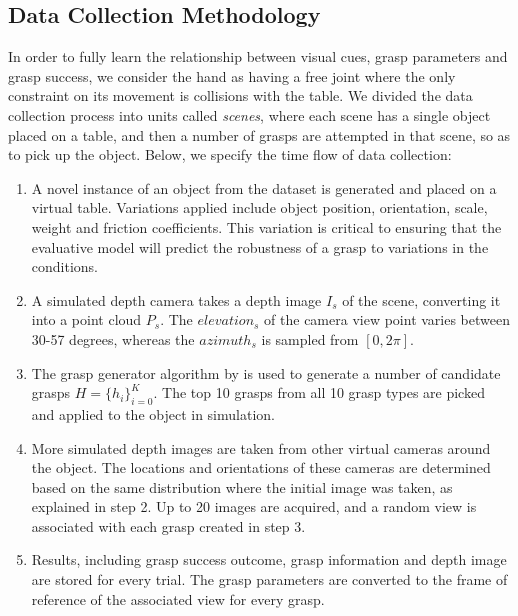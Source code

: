 \subsection{Data Collection Methodology}
\label{subsection:dataCollection}

In order to fully learn the relationship between visual cues, grasp parameters and grasp success, we  consider the hand as having a free joint where the only constraint on its movement is collisions with the table. We divided the data collection process into units called \textit{scenes}, where each scene has a single object placed on a table, and then a number of grasps are attempted in that scene, so as to pick up the object. Below, we specify the time flow of data collection:

\begin{enumerate}
\item A novel instance of an object from the dataset is generated and placed on a virtual table. Variations applied include object position, orientation, scale, weight and friction coefficients. This variation is critical to ensuring that the evaluative model will predict the robustness of a grasp to variations in the conditions.
\item A simulated depth camera takes a depth image $I_s$ of the scene, converting it into a point cloud $P_s$. The ${elevation}_s$ of the camera view point varies between 30-57 degrees, whereas the ${azimuth}_s$ is sampled from $[0, 2\pi]$. 
\item The grasp generator algorithm by \citet{kopicki2015ijrr} is used to generate a number of candidate grasps $H = \{h_i\}_{i=0}^{K}$. The top 10 grasps from all 10 grasp types are picked and applied to the object in simulation.
\item More simulated depth images are taken from other virtual cameras around the object. The locations and orientations of these cameras are determined based on the same distribution where the initial image was taken, as explained in step 2. Up to 20 images are acquired, and a random view is associated with each grasp created in step 3. 
\item Results, including grasp success outcome, grasp information and depth image are stored for every trial. The grasp parameters are converted to the frame of reference of the associated view for every grasp.
\end{enumerate}


